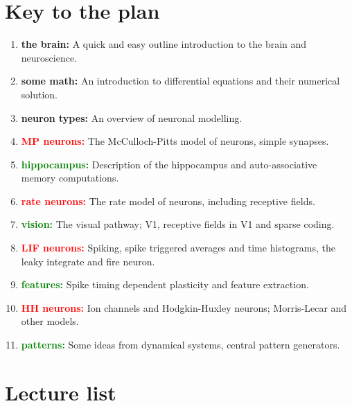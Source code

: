 \documentclass[11pt,a4paper]{scrartcl}
\begin{document}
\section*{Key to the plan}


\begin{enumerate}[label=(\alph*)]
\item \textbf{the brain:} A quick and easy outline introduction to the brain and neuroscience.
\item \textbf{some math:} An introduction to differential equations and their numerical solution.
\item \textbf{neuron types:} An overview of neuronal modelling.
\item \textbf{\textcolor{red}{MP neurons:}} The McCulloch-Pitts model of neurons, simple synapses.
\item \textbf{\textcolor{green}{hippocampus:}} Description of the hippocampus and auto-associative memory computations.
\item \textbf{\textcolor{red}{rate neurons:}} The rate model of neurons, including
  receptive fields.
\item \textbf{\textcolor{green}{vision:}} The visual pathway; V1, receptive fields in V1 and sparse coding.
\item \textbf{\textcolor{red}{LIF neurons:}} Spiking, spike triggered averages and time histograms, the leaky integrate and fire neuron.
\item \textbf{\textcolor{green}{features:}} Spike timing dependent plasticity and feature extraction.
\item \textbf{\textcolor{red}{HH neurons:}} Ion channels and Hodgkin-Huxley neurons;
  Morris-Lecar and other models.
\item \textbf{\textcolor{green}{patterns:}} Some ideas from dynamical systems, central pattern generators.
\end{enumerate}

\section*{Lecture list}
\end{document}
